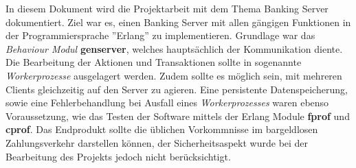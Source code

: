 In diesem Dokument wird die Projektarbeit mit dem Thema Banking Server dokumentiert. Ziel war es, einen Banking Server mit allen gängigen Funktionen in der Programmiersprache ''Erlang'' zu implementieren. Grundlage war das \textit{Behaviour Modul} \textbf{gen\textunderscore server}, welches hauptsächlich der Kommunikation diente. Die Bearbeitung der Aktionen und Transaktionen sollte in sogenannte \textit{Workerprozesse} ausgelagert werden. Zudem sollte es möglich sein, mit mehreren Clients gleichzeitig auf den Server zu agieren. Eine persistente Datenspeicherung, sowie eine Fehlerbehandlung bei Ausfall eines \textit{Workerprozesses} waren ebenso Voraussetzung, wie das Testen der Software mittels der Erlang Module \textbf{fprof} und \textbf{cprof}. Das Endprodukt sollte die üblichen Vorkommnisse im bargeldlosen Zahlungsverkehr darstellen können, der Sicherheitsaspekt wurde bei der Bearbeitung des Projekts jedoch nicht berücksichtigt.